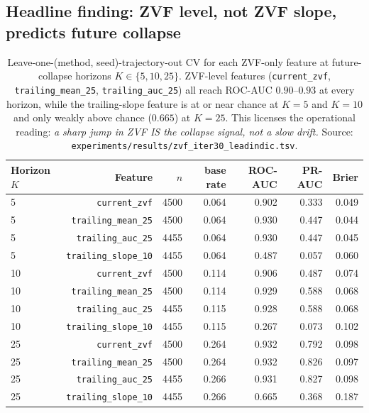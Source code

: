\documentclass{article}
\begin{document}
\subsection{Headline finding: ZVF level, not ZVF slope, predicts future collapse}
\label{sec:zvf-iter30-finding}

\begin{table}[htbp]
\centering
\small
\setlength{\tabcolsep}{4pt}
\begin{tabular}{lrrrrrr}
\hline
Horizon $K$ & Feature & $n$ & base rate & ROC-AUC & PR-AUC & Brier \\
\hline
5  & \texttt{current\_zvf}        & 4500 & 0.064 & 0.902 & 0.333 & 0.049 \\
5  & \texttt{trailing\_mean\_25}  & 4500 & 0.064 & 0.930 & 0.447 & 0.044 \\
5  & \texttt{trailing\_auc\_25}   & 4455 & 0.064 & 0.930 & 0.447 & 0.045 \\
5  & \texttt{trailing\_slope\_10} & 4455 & 0.064 & 0.487 & 0.057 & 0.060 \\
10 & \texttt{current\_zvf}        & 4500 & 0.114 & 0.906 & 0.487 & 0.074 \\
10 & \texttt{trailing\_mean\_25}  & 4500 & 0.114 & 0.929 & 0.588 & 0.068 \\
10 & \texttt{trailing\_auc\_25}   & 4455 & 0.115 & 0.928 & 0.588 & 0.068 \\
10 & \texttt{trailing\_slope\_10} & 4455 & 0.115 & 0.267 & 0.073 & 0.102 \\
25 & \texttt{current\_zvf}        & 4500 & 0.264 & 0.932 & 0.792 & 0.098 \\
25 & \texttt{trailing\_mean\_25}  & 4500 & 0.264 & 0.932 & 0.826 & 0.097 \\
25 & \texttt{trailing\_auc\_25}   & 4455 & 0.266 & 0.931 & 0.827 & 0.098 \\
25 & \texttt{trailing\_slope\_10} & 4455 & 0.266 & 0.665 & 0.368 & 0.187 \\
\hline
\end{tabular}
\caption{Leave-one-(method, seed)-trajectory-out CV for each ZVF-only feature
at future-collapse horizons $K \in \{5, 10, 25\}$. ZVF-level features
(\texttt{current\_zvf}, \texttt{trailing\_mean\_25}, \texttt{trailing\_auc\_25})
all reach ROC-AUC $0.90$–$0.93$ at every horizon, while the trailing-slope
feature is at or near chance at $K{=}5$ and $K{=}10$ and only weakly above
chance ($0.665$) at $K{=}25$. This licenses the operational reading:
\emph{a sharp jump in ZVF IS the collapse signal, not a slow drift.}
Source: \texttt{experiments/results/zvf\_iter30\_leadindic.tsv}.}
\label{tab:zvf-iter30-leadindic}
\end{table}
\end{document}
